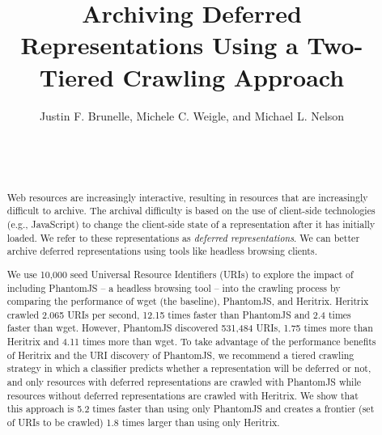 \documentclass{ipres_proc_article-sp}
\begin{document}
\title{Archiving Deferred Representations Using a Two-Tiered Crawling Approach}


\author{
\alignauthor
Justin F. Brunelle, Michele C. Weigle, and Michael L. Nelson\\
       \\
       \\
       \\
}

\maketitle
\begin{abstract}
Web resources are increasingly interactive, resulting in resources that are increasingly difficult to archive. The archival difficulty is based on the use of client-side technologies (e.g., JavaScript) to change the client-side state of a representation after it has initially loaded. We refer to these representations as \emph{deferred representations}. We can better archive deferred representations using tools like headless browsing clients. 

We use 10,000 seed Universal Resource Identifiers (URIs) to explore the impact of including PhantomJS -- a headless browsing tool -- into the crawling process by comparing the performance of wget (the baseline), PhantomJS, and Heritrix. Heritrix crawled 2.065 URIs per second, 12.15 times faster than PhantomJS and 2.4 times faster than wget. However, PhantomJS discovered 531,484 URIs, 1.75 times more than Heritrix and 4.11 times more than wget. To take advantage of the performance benefits of Heritrix and the URI discovery of PhantomJS, we recommend a tiered crawling strategy in which a classifier predicts whether a representation will be deferred or not, and only resources with deferred representations are crawled with PhantomJS while resources without deferred representations are crawled with Heritrix. We show that this approach is 5.2 times faster than using only PhantomJS and creates a frontier (set of URIs to be crawled) 1.8 times larger than using only Heritrix.
\end{abstract}

\end{document}
